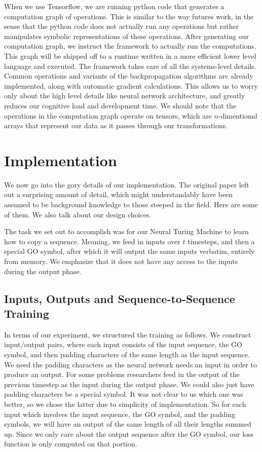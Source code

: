 \documentclass[12pt]{article}
\begin{document}
When we use Tensorflow, we are running python code that generates a computation
graph of operations. This is similar to the way futures work, in the sense
that the python code does not actually run any operations but rather
manipulates symbolic representations of these operations. After generating
our computation graph, we instruct the framework to actually run the computations.
This graph will be shipped off to a runtime written in a more efficient lower level
language and executed. The framework takes care of all the systems-level details.
Common operations and variants of the backpropagation algorithms are already implemented,
along with automatic gradient calculations. This allows us to worry only about the
high level details like neural network architecture, and greatly reduces our cognitive
load and development time. We should note that the operations in the computation graph
operate on tensors, which are $n$-dimentional arrays that represent our data as
it passes through our transformations.

\section{Implementation}\label{implementation}

We now go into the gory details of our implementation. The original paper left out
a surprising amount of detail, which might understandably have been
assumed to be background knowledge to those steeped in the field. Here are
some of them. We also talk about our design choices.

The task we set out to accomplish was for our Neural Turing Machine to learn
how to copy a sequence. Meaning, we feed in inputs over $t$ timesteps, and then
a special GO symbol, after which it will output the same inputs verbatim, entirely
from memory. We emphasize that it does not have any access to the inputs during the output
phase.

\subsection{Inputs, Outputs and Sequence-to-Sequence Training}

In terms of our experiment, we structured the training as follows. We
construct input/output pairs, where each input consists of the input sequence,
the GO symbol, and then padding characters of the same length as the input sequence.
We need the padding characters as the neural network needs an input in order to
produce an output. For some problems researchers feed in the output of the previous
timestep as the input during the output phase. We could also just have padding
characters be a special symbol. It was not clear to us which one was better, so
we chose the latter due to simplicity of implementation. So for each input
which involves the input sequence, the GO symbol, and the padding symbols,
we will have an output of the same length of all their lengths summed up.
Since we only care about the output sequence after the GO symbol,
our loss function is only computed on that portion.
\end{document}
